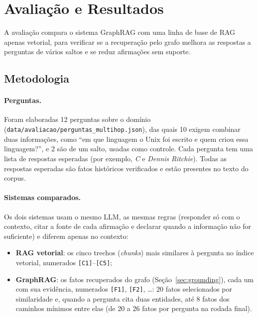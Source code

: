%

\section{Avaliação e Resultados}
\label{sec:avaliacao}

A avaliação compara o sistema GraphRAG com uma linha de base de RAG apenas vetorial, para verificar se a recuperação pelo grafo melhora as respostas a perguntas de vários saltos e se reduz afirmações sem suporte.

\subsection{Metodologia}

\paragraph{Perguntas.} Foram elaboradas 12 perguntas sobre o domínio (\texttt{data/avaliacao/perguntas\_multihop.json}), das quais 10 exigem combinar duas informações, como ``em que linguagem o Unix foi escrito e quem criou essa linguagem?'', e 2 são de um salto, usadas como controle. Cada pergunta tem uma lista de respostas esperadas (por exemplo, \emph{C} e \emph{Dennis Ritchie}). Todas as respostas esperadas são fatos históricos verificados e estão presentes no texto do corpus.

\paragraph{Sistemas comparados.} Os dois sistemas usam o mesmo LLM, as mesmas regras (responder só com o contexto, citar a fonte de cada afirmação e declarar quando a informação não for suficiente) e diferem apenas no contexto:
\begin{itemize}
  \item \textbf{RAG vetorial}: os cinco trechos (\emph{chunks}) mais similares à pergunta no índice vetorial, numerados \texttt{[C1]}--\texttt{[C5]};
  \item \textbf{GraphRAG}: os fatos recuperados do grafo (Seção~\ref{sec:grounding}), cada um com sua evidência, numerados \texttt{[F1]}, \texttt{[F2]}, \ldots{}: 20 fatos selecionados por similaridade e, quando a pergunta cita duas entidades, até 8 fatos dos caminhos mínimos entre elas (de 20 a 26 fatos por pergunta na rodada final).
\end{itemize}

